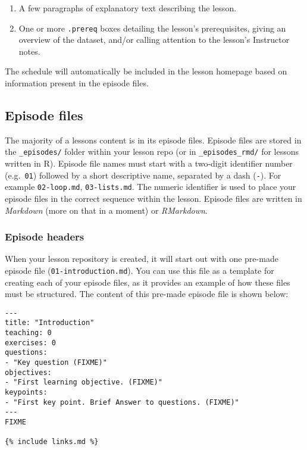 \documentclass[
]{book}
\providecommand{\tightlist}{%
  \setlength{\itemsep}{0pt}\setlength{\parskip}{0pt}}
\begin{document}
\begin{enumerate}
\def\labelenumi{\arabic{enumi}.}
\tightlist
\item
  A few paragraphs of explanatory text describing the lesson.
\item
  One or more \texttt{.prereq} boxes detailing the lesson's prerequisites, giving an overview of the dataset, and/or calling attention to the lesson's Instructor notes.
\end{enumerate}

The schedule will automatically be included in the lesson homepage based on information present in the
episode files.

\hypertarget{episode-files}{%
\subsection{Episode files}\label{episode-files}}

The majority of a lessons content is in its episode files.
Episode files are stored in the \texttt{\_episodes/} folder within your lesson repo (or in \texttt{\_episodes\_rmd/} for lessons written in R).
Episode file names must start with a two-digit identifier number (e.g.~\texttt{01}) followed
by a short descriptive name, separated by a dash (\texttt{-}). For example \texttt{02-loop.md}, \texttt{03-lists.md}.
The numeric identifier is used to place your episode files in the correct sequence within the lesson.
Episode files are written in \emph{Markdown} (more on that in a moment) or \emph{RMarkdown}.

\hypertarget{episode-headers}{%
\subsubsection{Episode headers}\label{episode-headers}}

When your lesson repository is created, it will start out with one pre-made episode file (\texttt{01-introduction.md}).
You can use this file as a template for creating each of your episode files, as it provides an
example of how these files must be structured. The content of this pre-made episode file is shown below:

\begin{verbatim}
---
title: "Introduction"
teaching: 0
exercises: 0
questions:
- "Key question (FIXME)"
objectives:
- "First learning objective. (FIXME)"
keypoints:
- "First key point. Brief Answer to questions. (FIXME)"
---
FIXME

{% include links.md %}
\end{verbatim}
\end{document}
